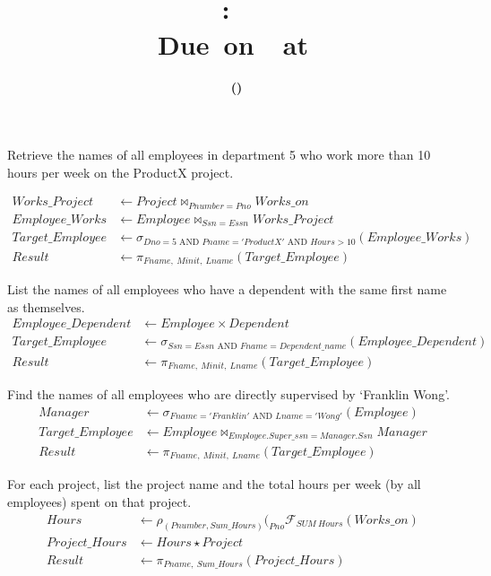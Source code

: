 \documentclass[12pt,letterpaper,titlepage,en-US]{article}
\title{
    \vspace{2in}
    \textmd{\textbf{\hmwkClassName \\\hmwkClass:\ \hmwkTitle}}\\
    \normalsize\vspace{0.1in}\small{Due\ on\ \DTMusedate{DueDate}\ at \DTMusetime{DueDate} }\\
    \vspace{0.1in}\large{\textit{\hmwkClassInstructor}}
    \vspace{3in}
}
\author{\textbf{\hmwkAuthorName\ \footnotesize{(\hmwkAuthorNetID)}} \\ \hmwkAuthorUTDEmail}
\date{}
\begin{document}
\maketitle


\pagebreak

\begin{homeworkProblem}
Retrieve the names of all employees in department 5 who work more than 10 hours per week on the ProductX project.

\begin{align*}
Works\_Project & \leftarrow Project \bowtie_{Pnumber = Pno} Works\_on \\
Employee\_Works & \leftarrow  Employee \bowtie_{Ssn = Essn} Works\_Project \\
Target\_Employee & \leftarrow \sigma_{Dno=5\text{ AND }Pname='ProductX'\text{ AND }Hours>10}(Employee\_Works) \\
Result & \leftarrow \pi_{Fname,\ Minit,\ Lname} (Target\_Employee)
\end{align*}

\end{homeworkProblem}


\begin{homeworkProblem}
List the names of all employees who have a dependent with the same first name as themselves.
\begin{align*}
    Employee\_Dependent & \leftarrow Employee \times Dependent \\
    Target\_Employee & \leftarrow \sigma_{Ssn=Essn\text{ AND }Fname=Dependent\_name} (Employee\_Dependent) \\
    Result & \leftarrow \pi_{Fname,\ Minit,\ Lname} (Target\_Employee)
\end{align*}
\end{homeworkProblem}

\begin{homeworkProblem}
Find the names of all employees who are directly supervised by ‘Franklin Wong’.
\begin{align*}
    Manager & \leftarrow \sigma_{Fname='Franklin'\text{ AND }Lname='Wong'}(Employee) \\
    Target\_Employee & \leftarrow Employee \bowtie_{Employee.Super\_ssn = Manager.Ssn}Manager \\
    Result & \leftarrow \pi_{Fname,\ Minit,\ Lname}(Target\_Employee)
\end{align*}
\end{homeworkProblem}

\begin{homeworkProblem}
For each project, list the project name and the total hours per week (by all employees) spent on that project.
\begin{align*}
    Hours & \leftarrow \rho_{(Pnumber, Sum\_Hours)}(_{Pno}\mathcal{F}_{SUM\ Hours}(Works\_on)\\
    Project\_Hours & \leftarrow Hours \star Project \\
    Result & \leftarrow \pi_{Pname,\ Sum\_Hours}(Project\_Hours)
\end{align*}
\end{homeworkProblem}
\end{document}
